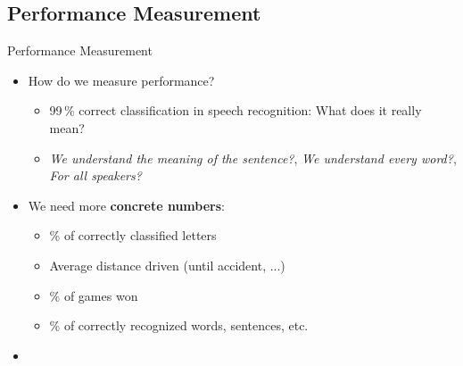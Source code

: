 \subsection{Performance Measurement}

\begin{frame}{Performance Measurement}{}
	\begin{itemize}
		\item How do we measure performance?
		\begin{itemize}
			\item 99\,\% correct classification in speech recognition: What does it really mean?
			\item \textit{We understand the meaning of the sentence?}, \textit{We understand every word?},
				\textit{For all speakers?}
		\end{itemize}
		\item We need more \textbf{concrete numbers}:
		\begin{itemize}
			\item \% of correctly classified letters
			\item Average distance driven (until accident, ...)
			\item \% of games won
			\item \% of correctly recognized words, sentences, etc.
		\end{itemize}
		\item {}
	\end{itemize}
\end{frame}


